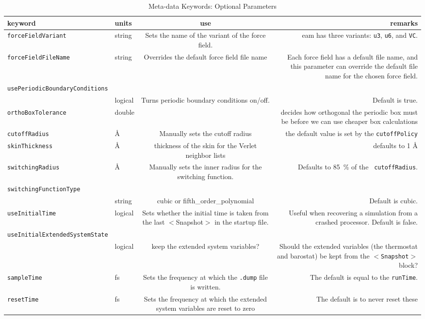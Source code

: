 \documentclass[]{book}
\begin{document}
\begin{longtable}[c]{ABCD}
\caption{Meta-data Keywords: Optional Parameters}
\\
{\bf keyword} & {\bf units} & {\bf use} & {\bf remarks}  \\ \hline
\endhead
\hline
\endfoot
{\tt forceFieldVariant} & string & Sets the name of the variant of the
force field.  & {\sc eam} has three variants: {\tt u3}, {\tt u6}, and
{\tt VC}. \\
{\tt forceFieldFileName} & string & Overrides the default force field
file name & Each force field has a default file name, and this
parameter can override the default file name for the chosen force
field. \\
{\tt usePeriodicBoundaryConditions} & & & \\
  & logical & Turns periodic boundary conditions on/off. & Default is true. \\
{\tt orthoBoxTolerance} & double & & decides how orthogonal the periodic
box must be before we can use cheaper box calculations \\
{\tt cutoffRadius} & $\mbox{\AA}$ & Manually sets the cutoff radius &
the default value is set by the {\tt cutoffPolicy} \\ 
{\tt skinThickness} & \AA & thickness of the skin for the Verlet
neighbor lists & defaults to 1 \AA \\
{\tt switchingRadius} & $\mbox{\AA}$  & Manually sets the inner radius
for the switching function. & Defaults to 85~\% of the {\tt
cutoffRadius}. \\
{\tt switchingFunctionType} & & & \\
 & string & cubic or
fifth\_order\_polynomial & Default is cubic. \\
{\tt useInitialTime} & logical & Sets whether the initial time is
taken from the last $<$Snapshot$>$ in the startup file. & Useful when recovering a simulation from a crashed processor. Default is false. \\
{\tt useInitialExtendedSystemState} & & & \\
  & logical & keep the extended
system variables? & Should the extended
variables (the thermostat and barostat) be kept from the {\tt $<$Snapshot$>$} block? \\
{\tt sampleTime} & fs & Sets the frequency at which the {\tt .dump} file is written. & The default is equal to the {\tt runTime}. \\
{\tt resetTime} & fs & Sets the frequency at which the extended system
variables are reset to zero & The default is to never reset these

\end{longtable}
\end{document}
